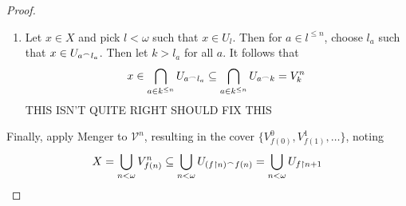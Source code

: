 \begin{proof}
\begin{enumerate}
      \item
      Let $x\in X$ and pick $l<\omega$ such that $x\in U_l$. Then for $a\in l^{\leq n}$, choose $l_a$ such that $x\in U_{a^\frown l_a}$. Then let $k>l_a$ for all $a$. It follows that \[x \in \bigcap_{a\in k^{\leq n}} U_{a^\frown l_a} \subseteq \bigcap_{a\in k^{\leq n}} U_{a^\frown k} = V_k^n\] THIS ISN'T QUITE RIGHT SHOULD FIX THIS
    \end{enumerate}

    Finally, apply Menger to $\mathcal{V}^n$, resulting in the cover $\{V_{f(0)}^0, V_{f(1)}^1, \dots\}$, noting \[X = \bigcup_{n<\omega}V_{f(n)}^n \subseteq \bigcup_{n<\omega} U_{(f\restriction n)^\frown f(n)} = \bigcup_{n<\omega} U_{f\restriction n+1}\]
  \end{proof}

